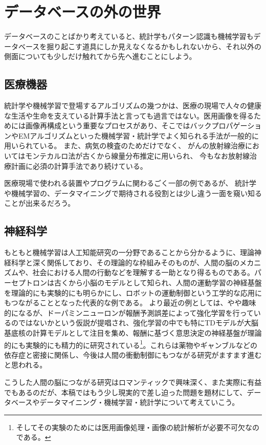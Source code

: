 \section{データベースの外の世界}
データベースのことばかり考えていると、統計学もパターン認識も機械学習もデータベースを掘り起こす道具にしか見えなくなるかもしれないから、それ以外の側面についても少しだけ触れてから先へ進むことにしよう。
\subsection{医療機器}
統計学や機械学習で登場するアルゴリズムの幾つかは、医療の現場で人々の健康な生活や生命を支えている計算手法と言っても過言ではない。医用画像を得るためには画像再構成という重要なプロセスがあり、そこではバックプロパゲーションやEMアルゴリズムといった機械学習・統計学でよく知られる手法が一般的に用いられている。
また、病気の検査のためだけでなく、
がんの放射線治療においてはモンテカルロ法が古くから線量分布推定に用いられ、
今もなお放射線治療計画に必須の計算手法であり続けている。

医療現場で使われる装置やプログラムに関わるごく一部の例であるが、
統計学や機械学習の、データマイニングで期待される役割とは少し違う一面を窺い知ることが出来るだろう。

\subsection{神経科学}
もともと機械学習は人工知能研究の一分野であることから分かるように、理論神経科学と深く関係しており、その理論的な枠組みそのものが、人間の脳のメカニズムや、社会における人間の行動などを理解する一助となり得るものである。パーセプトロンは古くから小脳のモデルとして知られ、人間の運動学習の神経基盤を理論的にも実験的にも明らかにし、ロボットの運動制御という工学的な応用にもつながることとなった代表的な例である。
より最近の例としては、やや趣味的になるが、ドーパミンニューロンが報酬予測誤差によって強化学習を行っているのではないかという仮説が提唱され、強化学習の中でも特にTDモデルが大脳基底核の計算モデルとして注目を集め、報酬に基づく意思決定の神経基盤が理論的にも実験的にも精力的に研究されている\footnote{そしてその実験のためには医用画像処理・画像の統計解析が必要不可欠なのである。}。これらは薬物やギャンブルなどの依存症と密接に関係し、今後は人間の衝動制御にもつながる研究がますます進むと思われる。

こうした人間の脳につながる研究はロマンティックで興味深く、また実際に有益でもあるのだが、本稿ではもう少し現実的で差し迫った問題を題材にして、データベースやデータマイニング・機械学習・統計学について考えていこう。

